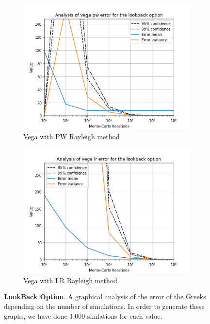 \documentclass[11pt,a4paper,fleqn]{article}
\begin{document}
\begin{figure}[h!]
      \begin{subfigure}[b]{0.45\textwidth}
          \includegraphics[width=\textwidth]{graphs/lookbackvegapw.png}
          \caption{Vega with PW Rayleigh method}
      \end{subfigure}
      \begin{subfigure}[b]{0.45\textwidth}
          \includegraphics[width=\textwidth]{graphs/lookbackvegalr.png}
          \caption{Vega with LR Rayleigh method}
      \end{subfigure}

      \caption{\textbf{LookBack Option}. A graphical analysis of the error of the Greeks depending on the number of simulations. In order to generate these graphs, we have done 1,000 simlations for each value.}
\end{figure}
\end{document}
